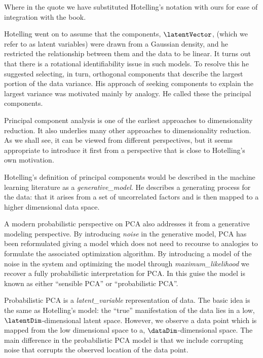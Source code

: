 Where in the quote we have substituted Hotelling's notation with ours
for ease of integration with the book.

Hotelling went on to assume that the components, $\latentVector$,
(which we refer to as latent variables) were drawn from a Gaussian
density, and he restricted the relationship between them and the data
to be linear. It turns out that there is a rotational identifiability
issue in such models. To resolve this he suggested selecting, in turn,
orthogonal components that describe the largest portion of the data
variance. His approach of seeking components to explain the largest
variance was motivated mainly by analogy. He called these the
principal components.

Principal component analysis is one of the earliest approaches to dimensionality
reduction. It also underlies many other approaches to dimensionality
reduction.  As we shall see, it can be viewed from different
perspectives, but it seems appropriate to introduce it first from a
perspective that is close to Hotelling's own motivation.

Hotelling's definition of principal components would be described in
the machine learning literature as a \emph{\gls{generative_model}}. He describes a generating process for the
data: that it arises from a set of uncorrelated factors and is then
mapped to a higher dimensional data space.

A modern probabilistic perspective on PCA
also addresses it from a generative modeling perspective. By
introducing \emph{\gls{noise}} in the generative model, PCA has been
reformulated giving a model which does not need to recourse to
analogies to formulate the associated optimization algorithm. By
introducing a model of the noise in the system and optimizing the
model through \emph{\gls{maximum_likelihood}} we recover a fully probabilistic
interpretation for PCA. In this guise the model is known as either
``sensible PCA'' or
``probabilistic PCA''.

Probabilistic PCA
\cite{Tipping:probpca99,Roweis:SPCA97}
is a \emph{\gls{latent_variable}} representation of data. The basic
idea is the same as Hotelling's model: the ``true'' manifestation of
the data lies in a low, $\latentDim$-dimensional latent
space. However, we observe a data point which is mapped from the low
dimensional space to a, $\dataDim$-dimensional space. The main
difference in the probabilistic PCA model is that we include
corrupting noise that corrupts the observed location of the data
point.

